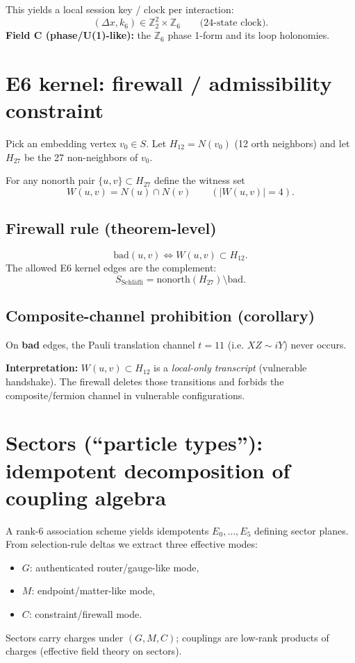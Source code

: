 \documentclass[11pt]{article}
\begin{document}
This yields a local session key / clock per interaction:
\[
(\Delta x,k_6)\in \mathbb{Z}_2^2\times \mathbb{Z}_6\qquad\text{(24-state clock)}.
\]
\noindent\textbf{Field C (phase/U(1)-like):} the $\mathbb{Z}_6$ phase 1-form and its loop holonomies.

\section{E6 kernel: firewall / admissibility constraint}
Pick an embedding vertex $v_0\in S$. Let $H_{12}=N(v_0)$ (12 orth neighbors) and let $H_{27}$ be the 27 non-neighbors of $v_0$.

For any nonorth pair $\{u,v\}\subset H_{27}$ define the witness set
\[
W(u,v)=N(u)\cap N(v)\qquad (\lvert W(u,v)\rvert=4).
\]

\subsection*{Firewall rule (theorem-level)}
\[
\boxed{\mathrm{bad}(u,v)\iff W(u,v)\subset H_{12}.}
\]
The allowed E6 kernel edges are the complement:
\[
S_{\text{Schl\"afli}}=\mathrm{nonorth}(H_{27})\setminus \mathrm{bad}.
\]

\subsection*{Composite-channel prohibition (corollary)}
On \textbf{bad} edges, the Pauli translation channel $t=11$ (i.e. $XZ\sim iY$) never occurs.

\noindent\textbf{Interpretation:}
$W(u,v)\subset H_{12}$ is a \emph{local-only transcript} (vulnerable handshake). The firewall deletes those transitions and forbids the composite/fermion channel in vulnerable configurations.

\section{Sectors (“particle types”): idempotent decomposition of coupling algebra}
A rank-6 association scheme yields idempotents $E_0,\dots,E_5$ defining sector planes. From selection-rule deltas we extract three effective modes:
\begin{itemize}
  \item $G$: authenticated router/gauge-like mode,
  \item $M$: endpoint/matter-like mode,
  \item $C$: constraint/firewall mode.
\end{itemize}
Sectors carry charges under $(G,M,C)$; couplings are low-rank products of charges (effective field theory on sectors).
\end{document}

